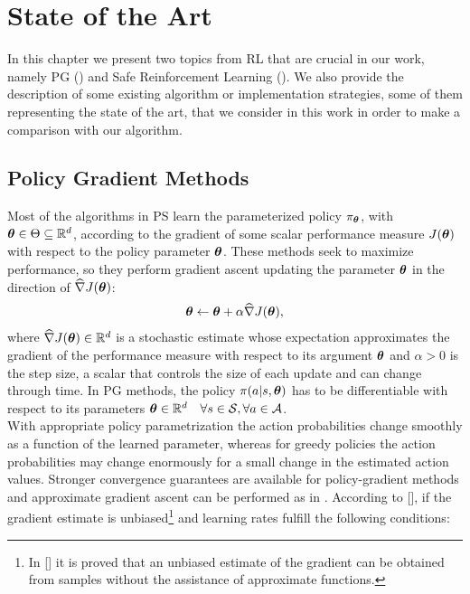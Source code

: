 \chapter{State of the Art} \label{chap:state}
In this chapter we present two topics from \ac{RL} that are crucial in our work, namely \acf{PG} () and Safe Reinforcement Learning (). We also provide the description of some existing algorithm or implementation strategies, some of them representing the state of the art, that we consider in this work in order to make a comparison with our algorithm.

\section{Policy Gradient Methods} \label{sec:pg}
Most of the algorithms in \ac{PS} learn the parameterized policy $\pi_{\boldsymbol{\theta}}$, with $\boldsymbol{\theta} \in \Theta \subseteq \mathbb{R}^d$, according to the gradient of some scalar performance measure $J(\boldsymbol{\theta})$ with respect to the policy parameter $\boldsymbol{\theta}$. These methods seek to maximize performance, so they perform gradient ascent updating the parameter $\boldsymbol{\theta}$ in the direction of $\widehat{\nabla}J(\boldsymbol{\theta})$:
\begin{align}
\boldsymbol{\theta} \leftarrow \boldsymbol{\theta} + \alpha \widehat{\nabla}J(\boldsymbol{\theta}), \label{eq:grad}
\end{align}
where $\widehat{\nabla}J(\boldsymbol{\theta}) \in \mathbb{R}^d$ is a stochastic estimate whose expectation approximates the gradient of the performance measure with respect to its argument $\boldsymbol{\theta}$ and $\alpha>0$ is the step size, a scalar that controls the size of each update and can change through time. In \ac{PG} methods, the policy $\pi(a|s,\boldsymbol{\theta})$ has to be differentiable with respect to its parameters $\boldsymbol{\theta} \in \mathbb{R}^d \quad \forall s \in \mathcal{S}, \forall a \in \mathcal{A}$.\\
\newline
\sloppy With appropriate policy parametrization the action probabilities change smoothly as a function of the learned parameter, whereas for greedy policies the action probabilities may change enormously for a small change in the estimated action values. Stronger convergence guarantees are available for policy-gradient methods and approximate gradient ascent can be performed as in . According to [\cite{peters2010pg}], if the gradient estimate is unbiased\footnote{In [\cite{williams1992simple}] it is proved that an unbiased estimate of the gradient can be obtained from samples without the assistance of approximate functions.} and learning rates fulfill the following conditions:
